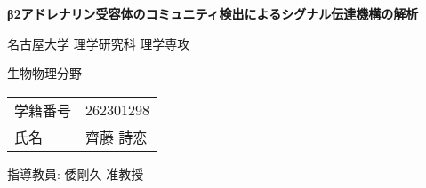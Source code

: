 \begin{titlepage}
    \centering
    \fontsize{40pt}{28pt}\selectfont
    \textbf{β2アドレナリン受容体のコミュニティ検出によるシグナル伝達機構の解析}
    \vspace{50pt}

    \fontsize{30pt}{18pt}\selectfont
    名古屋大学 理学研究科 理学専攻  
    \vspace{5pt}

    生物物理分野  
    \vspace{15pt}

    \fontsize{20pt}{19pt}\selectfont
    \begin{tabular}{ll}
        学籍番号 & 262301298 \\
        氏名   & 齊藤 詩恋 \\
    \end{tabular}
    \vspace{20pt}

    \fontsize{20pt}{19pt}\selectfont
    指導教員: 倭剛久 准教授
    \vspace{45pt}

\end{titlepage}
